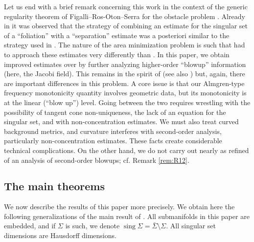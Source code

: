 \documentclass[11pt, letterpaper, reqno]{amsart}
\numberwithin{equation}{section}
\theoremstyle{remark}
\newcommand{\sing}{\operatorname{sing}}
\begin{document}
Let us end with a brief remark concerning this work in the context of the generic regularity theorem of Figalli--Ros-Oton--Serra for the obstacle problem \cite{FROS:ihes}. Already in \cite{CMS:generic.9.10} it was observed that the strategy of combining an estimate for the singular set of a ``foliation'' with a ``separation'' estimate was a posteriori similar to the strategy used in \cite{FROS:ihes}. The nature of the area minimization problem is such that \cite{CMS:generic.9.10} had to approach these estimates very differently than \cite{FROS:ihes}. In this paper, we obtain improved estimates over \cite{CMS:generic.9.10} by further analyzing higher-order ``blowup'' information (here, the Jacobi field). This remains in the spirit of \cite{FROS:ihes} (see also \cite{FigalliSerra}) but, again, there are important differences in this problem. A core issue is that our Almgren-type frequency monotonicity quantity involves geometric data, but its monotonicity is at the linear (``blow up'') level. Going between the two requires wrestling with the possibility of tangent cone non-uniqueness, the lack of an equation for the singular set, and with non-concentration estimates. We must also treat curved background metrics, and curvature interferes with second-order analysis, particularly non-concentration estimates. These facts create considerable technical complications. On the other hand, we do not carry out nearly as refined of an analysis of second-order blowups; cf. Remark \ref{rem:R12}. 


\subsection{The main theorems}
We now describe the results of this paper more precisely.  We obtain here the following generalizations of the main result of \cite{CMS:generic.9.10, CMS:generic.codim.plus.2}. All submanifolds in this paper are embedded, and if $\Sigma$ is such, we denote $\sing \Sigma = \bar \Sigma \setminus \Sigma$. All singular set dimensions are Hausdorff dimensions. 
\end{document}
